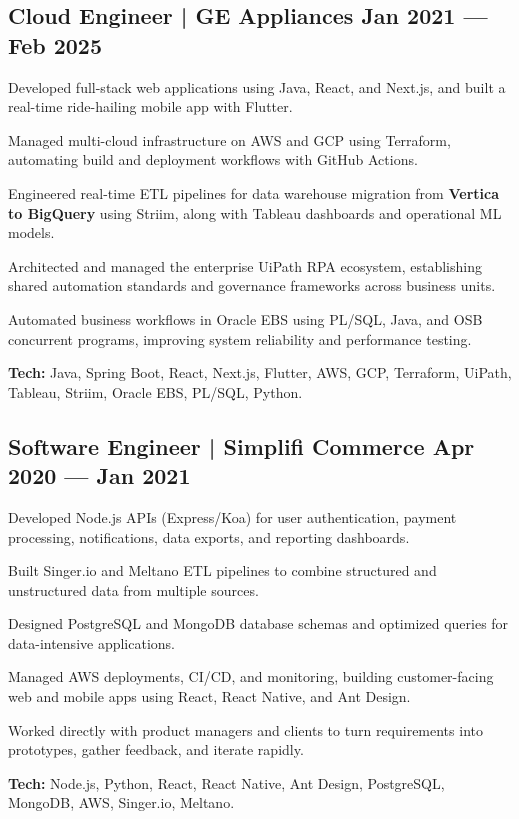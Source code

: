 \subsection[Cloud Engineer | GE Appliances (Jan 2021 --- Feb 2025)]{Cloud Engineer | GE Appliances \texorpdfstring{\hfill}{ } Jan 2021 --- Feb 2025}
\begin{zitemize}
    \item Developed full-stack web applications using Java, React, and Next.js, and built a real-time ride-hailing mobile app with Flutter.
    \item Managed multi-cloud infrastructure on AWS and GCP using Terraform, automating build and deployment workflows with GitHub Actions.
    \item Engineered real-time ETL pipelines for data warehouse migration from \textbf{Vertica to BigQuery} using Striim, along with Tableau dashboards and operational ML models.
    \item Architected and managed the enterprise UiPath RPA ecosystem, establishing shared automation standards and governance frameworks across business units.
    \item Automated business workflows in Oracle EBS using PL/SQL, Java, and OSB concurrent programs, improving system reliability and performance testing.
    \item \textbf{Tech:} Java, Spring Boot, React, Next.js, Flutter, AWS, GCP, Terraform, UiPath, Tableau, Striim, Oracle EBS, PL/SQL, Python.
\end{zitemize}

\subsection[Software Engineer | Simplifi Commerce (Apr 2020 --- Jan 2021)]{Software Engineer | Simplifi Commerce \texorpdfstring{\hfill}{ } Apr 2020 --- Jan 2021}
\begin{zitemize}
    \item Developed Node.js APIs (Express/Koa) for user authentication, payment processing, notifications, data exports, and reporting dashboards.
    \item Built Singer.io and Meltano ETL pipelines to combine structured and unstructured data from multiple sources.
    \item Designed PostgreSQL and MongoDB database schemas and optimized queries for data-intensive applications.
    \item Managed AWS deployments, CI/CD, and monitoring, building customer-facing web and mobile apps using React, React Native, and Ant Design.
    \item Worked directly with product managers and clients to turn requirements into prototypes, gather feedback, and iterate rapidly.
    \item \textbf{Tech:} Node.js, Python, React, React Native, Ant Design, PostgreSQL, MongoDB, AWS, Singer.io, Meltano.
\end{zitemize}

